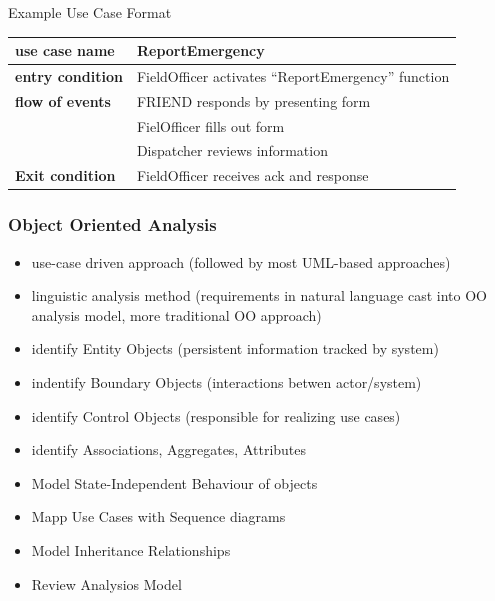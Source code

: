 \documentclass[a4paper, 10pt]{article}
\begin{document}
Example Use Case Format \\
\begin{tabular}{|l|l|}
\hline %
\textbf{use case name}	& ReportEmergency \\
\hline %
\textbf{entry condition}& FieldOfficer activates ``ReportEmergency'' function \\
\hline %
\textbf{flow of events}	& FRIEND responds by presenting form \\
						& FielOfficer fills out form \\
						& Dispatcher reviews information \\
\hline %
\textbf{Exit condition}	& FieldOfficer receives ack and response \\
\hline %
\end{tabular}

\subsubsection{Object Oriented Analysis}
\begin{itemize}
	\item use-case driven approach (followed by most UML-based approaches)
	\item linguistic analysis method (requirements in natural language  \follows cast into OO analysis model, more traditional OO approach)
	\item identify Entity Objects (persistent information tracked by system)
	\item indentify Boundary Objects (interactions betwen actor/system)
	\item identify Control Objects (responsible for realizing use cases)
	\item identify Associations, Aggregates, Attributes
	\item Model State-Independent Behaviour of objects
	\item Mapp Use Cases with Sequence diagrams
	\item Model Inheritance Relationships
	\item Review Analysios Model
\end{itemize}
\end{document}
